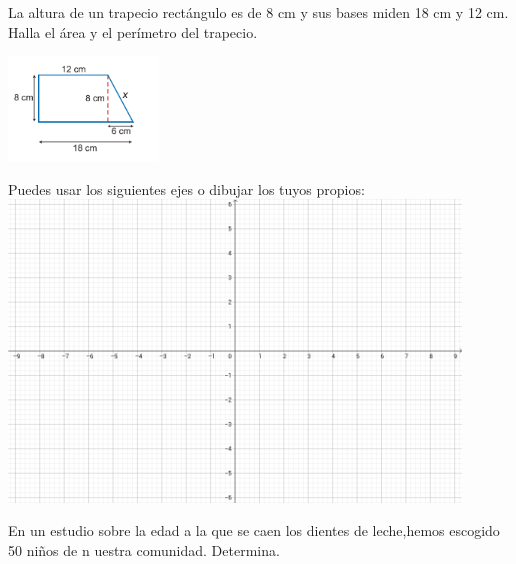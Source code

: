 \documentclass[addpoints,spanish, 12pt,a4paper]{exam}
\begin{document}
\begin{questions}
\question[1] La altura de un trapecio rectángulo es de 8 cm y sus bases miden 18 cm y 12 cm. Halla el área y el perímetro del trapecio.

\begin{center}
\includegraphics[width=0.3\textwidth]{trapecio}
\end{center}
    
\addpoints

\question[2] Puedes usar los siguientes ejes o dibujar los tuyos propios:\\
    \includegraphics[width=0.9\textwidth]{ejes}

\noaddpoints %
\addpoints

\question[2] En un estudio sobre la edad a la que se caen los dientes de leche,hemos escogido 50 niños de n uestra comunidad. Determina.
\noaddpoints %
\begin{parts}

\end{parts}
\end{questions}
\end{document}
